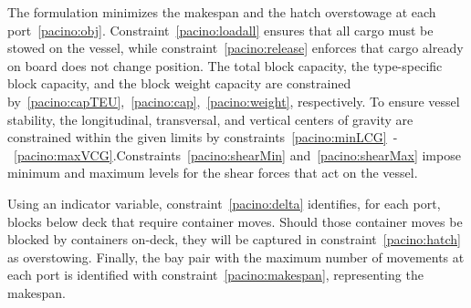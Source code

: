 \documentclass[preprint,12pt,authoryear]{elsarticle}
\begin{document}
The formulation minimizes the makespan and the hatch overstowage at each port~\eqref{pacino:obj}. Constraint~\eqref{pacino:loadall} ensures that all cargo must be stowed on the vessel, while constraint~\eqref{pacino:release} enforces that cargo already on board does not change position. The total block capacity, the type-specific block capacity, and the block weight capacity are constrained by~\eqref{pacino:capTEU},~\eqref{pacino:cap},~\eqref{pacino:weight}, respectively. To ensure vessel stability, the longitudinal, transversal, and vertical centers of gravity are constrained within the given limits by constraints~\eqref{pacino:minLCG}~-~\eqref{pacino:maxVCG}.Constraints~\eqref{pacino:shearMin} and~\eqref{pacino:shearMax} impose minimum and maximum levels for the shear forces that act on the vessel.

Using an indicator variable, constraint~\eqref{pacino:delta} identifies, for each port, blocks below deck that require container moves. Should those container moves be blocked by containers on-deck, they will be captured in constraint~\eqref{pacino:hatch} as overstowing. Finally, the bay pair with the maximum number of movements at each port is identified with constraint~\eqref{pacino:makespan}, representing the makespan. 
\end{document}
